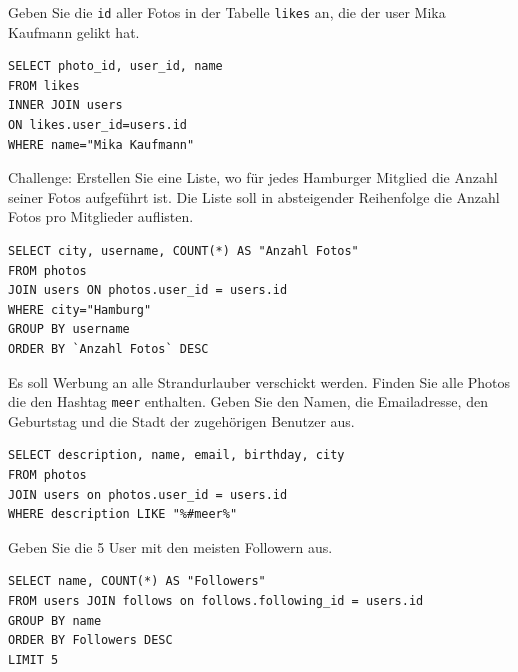 \begin{myexercise}
  Geben Sie die \texttt{id} aller Fotos in der Tabelle \texttt{likes} an, die der user Mika Kaufmann gelikt hat.
  \begin{myanswer}
    \begin{lstlisting}
SELECT photo_id, user_id, name 
FROM likes 
INNER JOIN users 
ON likes.user_id=users.id 
WHERE name="Mika Kaufmann"
\end{lstlisting}
  \end{myanswer}
\end{myexercise}
\begin{mychallenge}
  Challenge: Erstellen Sie eine Liste, wo für jedes Hamburger Mitglied die Anzahl seiner Fotos aufgeführt ist. Die Liste soll in absteigender Reihenfolge die Anzahl Fotos pro Mitglieder auflisten.
  \begin{myanswer}
    \begin{lstlisting}
SELECT city, username, COUNT(*) AS "Anzahl Fotos" 
FROM photos 
JOIN users ON photos.user_id = users.id 
WHERE city="Hamburg" 
GROUP BY username 
ORDER BY `Anzahl Fotos` DESC
\end{lstlisting}
  \end{myanswer}
\end{mychallenge}

\begin{myexercise}
  Es soll Werbung an alle Strandurlauber verschickt werden. Finden Sie alle Photos die den Hashtag \texttt{meer} enthalten. Geben Sie den Namen, die Emailadresse, den Geburtstag und die Stadt der zugehörigen Benutzer aus.
  \begin{myanswer}
    \begin{lstlisting}
SELECT description, name, email, birthday, city  
FROM photos 
JOIN users on photos.user_id = users.id 
WHERE description LIKE "%#meer%"
\end{lstlisting}
  \end{myanswer}
\end{myexercise}

\begin{myexercise}
  Geben Sie die 5 User mit den meisten Followern aus.
  \begin{myanswer}
    \begin{lstlisting}
SELECT name, COUNT(*) AS "Followers"
FROM users JOIN follows on follows.following_id = users.id 
GROUP BY name
ORDER BY Followers DESC
LIMIT 5
\end{lstlisting}
  \end{myanswer}
\end{myexercise}

